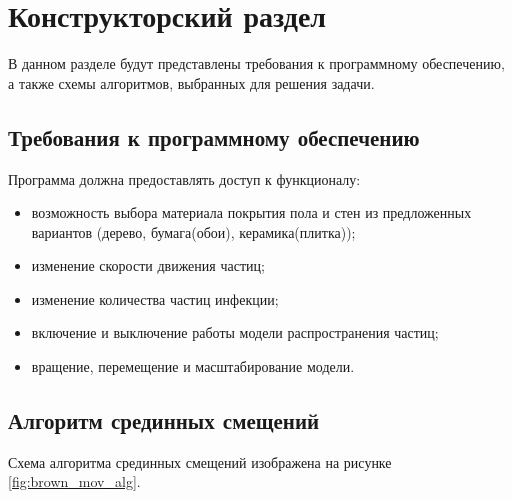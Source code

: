 \chapter{Конструкторский раздел}
\label{cha:design}

В данном разделе будут представлены требования к программному обеспечению, а также схемы алгоритмов, выбранных для решения задачи.

\section{Требования к программному обеспечению}

Программа должна предоставлять доступ к функционалу:

\begin{itemize}
	\item возможность выбора материала покрытия пола и стен из предложенных вариантов (дерево, бумага(обои), керамика(плитка));
	\item изменение скорости движения частиц;
	\item изменение количества частиц инфекции;
	\item включение и выключение работы модели распространения частиц;
	\item вращение, перемещение и масштабирование модели.
\end{itemize}

\section{Алгоритм срединных смещений}

Схема алгоритма срединных смещений изображена на рисунке \ref{fig:brown_mov_alg}.

